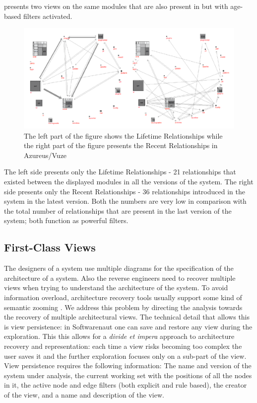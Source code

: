 \documentclass[preprint,12pt]{elsarticle}
\begin{document}
 presents two views on the same modules that are also present in  but with age-based filters activated. 

\begin{figure}[ht]
\begin{center}
\includegraphics[width=0.9\linewidth]{Architecture-LifetimeVsRecent}
\caption{The left part of the figure shows the Lifetime Relationships while the right part of the figure presents the Recent Relationships in Azureus/Vuze}
\end{center}
\end{figure}

The left side presents only the Lifetime Relationships - 21 relationships that existed between the displayed modules in all the versions of the system. The right side presents only the Recent Relationships - 36 relationships introduced in the system in the latest version. Both the numbers are very low in comparison with the total number of relationships that are present in the last version of the system; both function as powerful filters.

\subsection {First-Class Views}

The designers of a system use multiple diagrams for the specification of the architecture of a system. Also the reverse engineers need to recover multiple views when trying to understand the architecture of the system. To avoid information overload, architecture recovery tools usually support some kind of semantic zooming \cite{storey-shrimp}. We address this problem by directing the analysis towards the recovery of multiple architectural views. The technical detail that allows this is view persistence: in Softwarenaut one can save and restore any view during the exploration. This this allows for a {\em divide et impera} approach to architecture recovery and representation: each time a view risks becoming too complex the user saves it and the further exploration focuses only on a sub-part of the view. View persistence requires the following information: The name and version of the system under analysis, the current working set with the positions of all the nodes in it, the active node and edge filters (both explicit and rule based), the creator of the view, and a name and description of the view.
\end{document}
